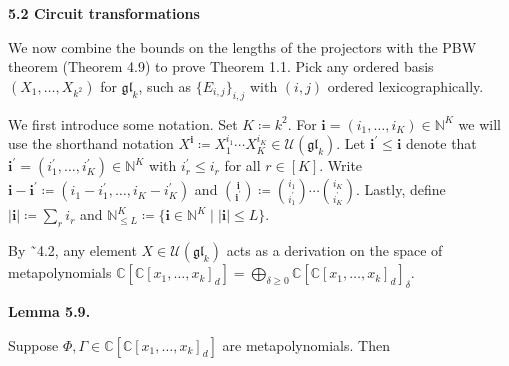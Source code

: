 \documentclass[10pt,a4paper]{article}
\begin{document}
\par\medskip\noindent\textbf{5.2 Circuit transformations}\par




We now combine the bounds on the lengths of the projectors with the PBW theorem (Theorem 4.9) to prove Theorem 1.1.
Pick any ordered basis $(X_{1},\ldots,X_{k^{2}})$ for $\mathfrak{gl}_{k}$, such as $\{E_{i,j}\}_{i,j}$ with $(i,j)$ ordered lexicographically.





We first introduce some notation.
Set $K\coloneqq k^{2}$.
For $\bm{i}=(i_{1},\ldots,i_{K})\in\mathbb{N}^{K}$ we will use the shorthand notation $X^{\bm{i}}\coloneqq X_{1}^{i_{1}}\cdots X_{K}^{i_{K}}\in\mathcal{U}(\mathfrak{gl}_{k})$.
Let $\bm{i}^{\prime}\leq\bm{i}$ denote that $\bm{i}^{\prime}=(i^{\prime}_{1},\ldots,i^{\prime}_{K})\in\mathbb{N}^{K}$ with $i^{\prime}_{r}\leq i_{r}$ for all $r\in[K]$.
Write $\bm{i}-\bm{i}^{\prime}\coloneqq(i_{1}-i^{\prime}_{1},\ldots,i_{K}-i^{\prime}_{K})$ and $\binom{\bm{i}}{\bm{i}^{\prime}}\coloneqq\binom{i_{1}}{i^{\prime}_{1}}\cdots\binom{i_{K}}{i^{\prime}_{K}}$. Lastly, define $|\bm{i}|\coloneqq\sum_{r}i_{r}$
and $\mathbb{N}^{K}_{\leq L}\coloneqq\{\bm{i}\in\mathbb{N}^{K}\mid|\bm{i}|\leq L\}$.





By ˜4.2, any element $X\in\mathcal{U}(\mathfrak{gl}_{k})$ acts as a derivation on the space of metapolynomials $\mathbb{C}[\mathbb{C}[x_{1},\ldots,x_{k}]_{d}]=\bigoplus_{\delta\geq 0}\mathbb{C}[\mathbb{C}[x_{1},\ldots,x_{k}]_{d}]_{\delta}$.





\par\medskip\noindent\textbf{Lemma 5.9.}\par



Suppose $\Phi,\Gamma\in\mathbb{C}[\mathbb{C}[x_{1},\ldots,x_{k}]_{d}]$ are metapolynomials. Then
\end{document}
